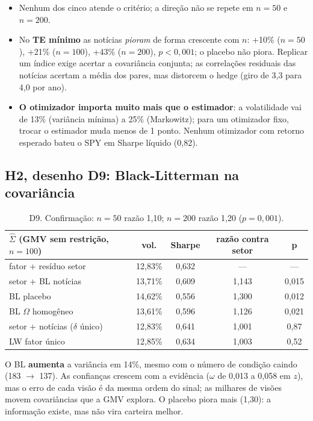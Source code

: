 \documentclass[11pt,a4paper]{article}
\newcommand{\Sig}{\hat\Sigma}
\begin{document}
\begin{itemize}
  \item Nenhum dos cinco atende o critério; a direção não se repete em $n=50$ e $n=200$.
  \item No \textbf{TE mínimo} as notícias \emph{pioram} de forma crescente com $n$: +10\% ($n=50$), +21\%
        ($n=100$), +43\% ($n=200$), $p<0{,}001$; o placebo não piora. Replicar um índice exige acertar a
        covariância conjunta; as correlações residuais das notícias acertam a média dos pares, mas
        distorcem o hedge (giro de 3,3 para 4,0 por ano).
  \item \textbf{O otimizador importa muito mais que o estimador}: a volatilidade vai de 13\% (variância
        mínima) a 25\% (Markowitz); para um otimizador fixo, trocar o estimador muda menos de 1 ponto.
        Nenhum otimizador com retorno esperado bateu o SPY em Sharpe líquido (0,82).
\end{itemize}

\subsection{H2, desenho D9: Black-Litterman na covariância}

\begin{table}[h]
\centering\small
\begin{tabular}{lcccc}
\toprule
$\Sig$ (GMV sem restrição, $n=100$) & vol. & Sharpe & razão contra setor & p \\
\midrule
fator + resíduo setor & 12,83\% & 0,632 & --- & --- \\
setor + BL notícias & 13,71\% & 0,609 & 1,143 & 0,015 \\
BL placebo & 14,62\% & 0,556 & 1,300 & 0,012 \\
BL $\Omega$ homogêneo & 13,61\% & 0,596 & 1,126 & 0,021 \\
setor + notícias ($\delta$ único) & 12,83\% & 0,641 & 1,001 & 0,87 \\
LW fator único & 12,85\% & 0,634 & 1,003 & 0,52 \\
\bottomrule
\end{tabular}
\caption{D9. Confirmação: $n=50$ razão 1,10; $n=200$ razão 1,20 ($p=0{,}001$).}
\end{table}

O BL \textbf{aumenta} a variância em 14\%, mesmo com o número de condição caindo (183 $\to$ 137). As
confianças crescem com a evidência ($\omega$ de 0,013 a 0,058 em $z$), mas o erro de cada visão é da
mesma ordem do sinal; as milhares de visões movem covariâncias que a GMV explora. O placebo piora mais
(1,30): a informação existe, mas não vira carteira melhor.
\end{document}
